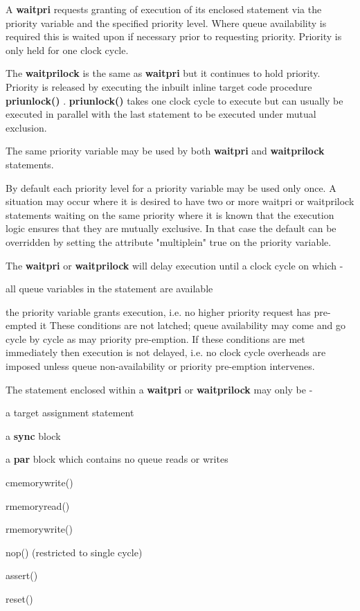        A {\bf waitpri} requests granting of execution of its enclosed
        statement via the priority variable and the specified priority
        level. Where queue availability is required this is waited upon
        if necessary prior to requesting priority. Priority is only
        held for one clock cycle.
        
        The {\bf waitprilock} is the same as {\bf waitpri} but it continues
        to hold priority. Priority is released by executing the inbuilt
        inline target code procedure {\bf priunlock()}
        . {\bf priunlock()} takes one clock cycle to
        execute but can usually be executed in parallel with the last
        statement to be executed under mutual exclusion.
        
        The same priority variable may be used by both {\bf waitpri} and
        {\bf waitprilock} statements.
        
        By default each priority level for a priority variable may be
        used only once. A situation may occur where it is desired to have
        two or more waitpri or waitprilock statements waiting on the same
        priority where it is known that the execution logic ensures that
        they are mutually exclusive. In that case the default can be
        overridden by setting the attribute "multiplein" true on the
        priority variable.

        The {\bf waitpri} or {\bf waitprilock} will delay execution until a
        clock cycle on which -
        \blist
        \item   all queue variables in the statement are available
        \item   the priority variable grants execution, i.e. no higher
                priority request has pre-empted it
        \blend
        These conditions are not latched; queue availability may come and
        go cycle by cycle as may priority pre-emption. If these conditions
        are met immediately then execution is not delayed, i.e. no clock cycle
        overheads are imposed unless queue non-availability or priority
        pre-emption intervenes.

        The statement enclosed within a {\bf waitpri} or {\bf waitprilock}
        may only be -
        \blist
        \item   a target assignment statement
        \item   a {\bf sync} block
        \item   a {\bf par} block which contains no queue reads or writes
        \item   cmemorywrite()
        \item   rmemoryread()
        \item   rmemorywrite()
        \item   nop() (restricted to single cycle)
        \item   assert()
        \item   reset()
        \blend
        
